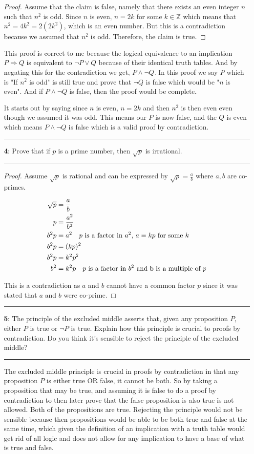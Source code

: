 \documentclass[11pt]{article}
\newcommand\question[2]{\vspace{.25in}\hrule\textbf{#1}: #2\vspace{.5em}\hrule\vspace{.10in}}
\newcommand{\Z}{\mathbb{Z}}
\begin{document}
\begin{proof}
	Assume that the claim is false, namely that there exists an even integer $n$ such that $n^2$ is odd. Since $n$ is even, $n=2k$ for some $k \in \Z$ which means that $n^2 = 4k^2 = 2(2k^2)$, which is an even number. But this is a contradiction because we assumed that $n^2$ is odd. Therefore, the claim is true.
\end{proof}

This proof is correct to me because the logical equivalence to an implication $P \Rightarrow Q$ is equivalent to $\lnot P \lor Q$ because of their identical truth tables. And by negating this for the contradiction we get, $P \land \lnot Q$. In this proof we say $P$ which is "If $n^2$ is odd" is still true and prove that $\lnot Q$ is false which would be "$n$ is even". And if $P \land \lnot Q$ is false, then the proof would be complete.

It starts out by saying since $n$ is even, $n=2k$ and then $n^2$ is then even even though we assumed it was odd. This means our $P$ is now false, and the $Q$ is even which means $P \land \lnot Q$ is false which is a valid proof by contradiction.

\question{4}{Prove that if $p$ is a prime number, then $\sqrt{p}$ is irrational.}

\begin{proof}
	Assume $\sqrt{p}$ is rational and can be expressed by $\sqrt{p} = \frac{a}{b}$ where $a, b$ are co-primes.

	\begin{align*}
		\sqrt{p} &= \frac{a}{b}\\
		p &= \frac{a^2}{b^2}\\
		b^2p &= a^2 \text{\quad $p$ is a factor in $a^2$, }a = kp \text{ for some $k$}\\
		b^2p &= (kp)^2\\
		b^2p &= k^2p^2\\
		b^2 &= k^2p \text{\quad $p$ is a factor in $b^2$ and b is a multiple of $p$}
	\end{align*}

	This is a contradiction as $a$ and $b$ cannot have a common factor $p$ since it was stated that $a$ and $b$ were co-prime.
\end{proof}

\question{5}{The principle of the excluded middle asserts that, given any proposition $P$, either $P$ is true or $\lnot P$ is true. Explain how this principle is crucial to proofs by contradiction. Do you think it's sensible to reject the principle of the excluded middle?}

The excluded middle principle is crucial in proofs by contradiction in that any proposition $P$ is either true OR false, it cannot be both. So by taking a proposition that may be true, and assuming it is false to do a proof by contradiction to then later prove that the false proposition is also true is not allowed. Both of the propositions are true. Rejecting the principle would not be sensible because then propositions would be able to be both true and false at the same time, which given the definition of an implication with a truth table would get rid of all logic and does not allow for any implication to have a base of what is true and false. 
	
\end{document}
